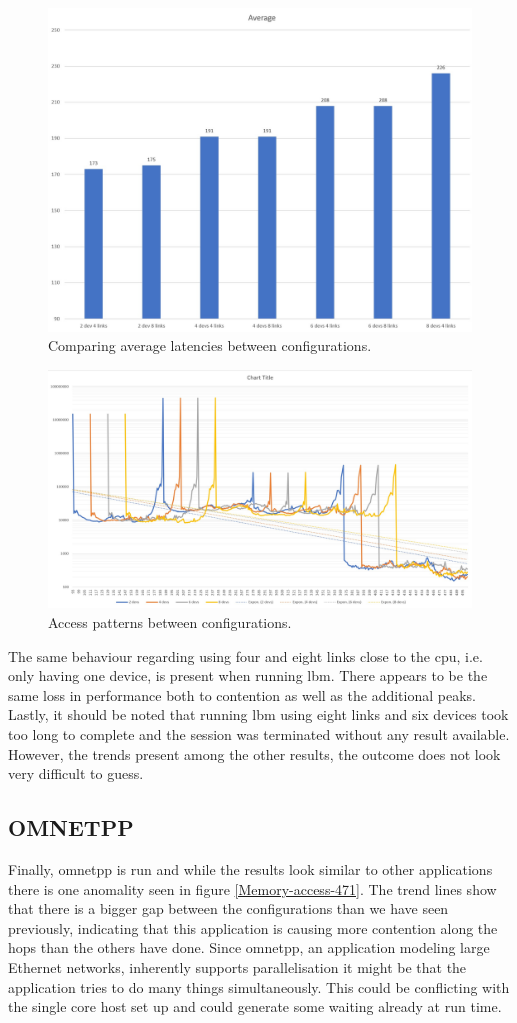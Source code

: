 \begin{figure}[!h]
    \centering
    \includegraphics[width=0.75\linewidth]{figure/470-averages.jpg}
    \caption{Comparing average latencies between configurations.}
    \label{Memory-access-470-averages}
\end{figure}

\begin{figure}[!h]
    \centering
    \includegraphics[width=0.75\linewidth]{figure/470-x.4.jpg}
    \caption{Access patterns between configurations.}
    \label{Memory-access-470}
\end{figure}

The same behaviour regarding using four and eight links close to the cpu, i.e. only having one device, is present when running lbm. There appears to be the same loss in performance both to contention as well as the additional peaks. Lastly, it should be noted that running lbm using eight links and six devices took too long to complete and the session was terminated without any result available. However, the trends present among the other results, the outcome does not look very difficult to guess.

\subsection{OMNETPP}
Finally, omnetpp is run and while the results look similar to other applications there is one anomality seen in figure \ref{Memory-access-471}. The trend lines show that there is a bigger gap between the configurations than we have seen previously, indicating that this application is causing more contention along the hops than the others have done. Since omnetpp, an application modeling large Ethernet networks, inherently supports parallelisation it might be that the application tries to do many things simultaneously. This could be conflicting with the single core host set up and could generate some waiting already at run time. 
\bigskip

